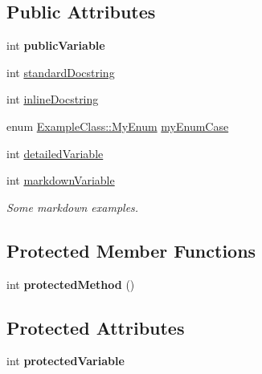 \subsection*{Public Attributes}
\begin{DoxyCompactItemize}
\item 
\hypertarget{class_example_class_a7c66a5f6704ad3fb878489c4bb7809ff}{}int {\bfseries public\+Variable}\label{class_example_class_a7c66a5f6704ad3fb878489c4bb7809ff}

\item 
int \hyperlink{class_example_class_a0b61c0174aff35afaca216512f535f6f}{standard\+Docstring}
\item 
int \hyperlink{class_example_class_adf5ff59e0a9de18fe8ec344771b843ff}{inline\+Docstring}
\item 
enum \hyperlink{class_example_class_a18344ab645e45ff0a5367165c1de4e49}{Example\+Class\+::\+My\+Enum} \hyperlink{class_example_class_afcd68bb9793b264f120c39058cab7c0f}{my\+Enum\+Case}
\item 
int \hyperlink{class_example_class_a621c5f7b94cb4e4c2e7e04e70cf7181e}{detailed\+Variable}
\item 
int \hyperlink{class_example_class_afbf6f2e5884b62fd8e3624b2ea357281}{markdown\+Variable}
\begin{DoxyCompactList}\small\item\em Some markdown examples. \end{DoxyCompactList}\end{DoxyCompactItemize}
\subsection*{Protected Member Functions}
\begin{DoxyCompactItemize}
\item 
\hypertarget{class_example_class_a114ceca4bf6d5a2d6d0144c495aa87e3}{}int {\bfseries protected\+Method} ()\label{class_example_class_a114ceca4bf6d5a2d6d0144c495aa87e3}

\end{DoxyCompactItemize}
\subsection*{Protected Attributes}
\begin{DoxyCompactItemize}
\item 
\hypertarget{class_example_class_a1f7173f9ff74be810b419081852498da}{}int {\bfseries protected\+Variable}\label{class_example_class_a1f7173f9ff74be810b419081852498da}

\end{DoxyCompactItemize}


